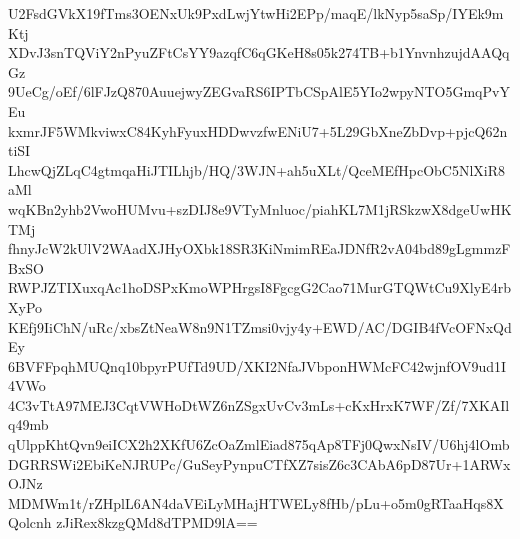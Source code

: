 U2FsdGVkX19fTms3OENxUk9PxdLwjYtwHi2EPp/maqE/lkNyp5saSp/IYEk9mKtj
XDvJ3snTQViY2nPyuZFtCsYY9azqfC6qGKeH8s05k274TB+b1YnvnhzujdAAQqGz
9UeCg/oEf/6lFJzQ870AuuejwyZEGvaRS6IPTbCSpAlE5YIo2wpyNTO5GmqPvYEu
kxmrJF5WMkviwxC84KyhFyuxHDDwvzfwENiU7+5L29GbXneZbDvp+pjcQ62ntiSI
LhcwQjZLqC4gtmqaHiJTILhjb/HQ/3WJN+ah5uXLt/QceMEfHpcObC5NlXiR8aMl
wqKBn2yhb2VwoHUMvu+szDIJ8e9VTyMnluoc/piahKL7M1jRSkzwX8dgeUwHKTMj
fhnyJcW2kUlV2WAadXJHyOXbk18SR3KiNmimREaJDNfR2vA04bd89gLgmmzFBxSO
RWPJZTIXuxqAc1hoDSPxKmoWPHrgsI8FgcgG2Cao71MurGTQWtCu9XlyE4rbXyPo
KEfj9IiChN/uRc/xbsZtNeaW8n9N1TZmsi0vjy4y+EWD/AC/DGIB4fVcOFNxQdEy
6BVFFpqhMUQnq10bpyrPUfTd9UD/XKI2NfaJVbponHWMcFC42wjnfOV9ud1I4VWo
4C3vTtA97MEJ3CqtVWHoDtWZ6nZSgxUvCv3mLs+cKxHrxK7WF/Zf/7XKAIlq49mb
qUlppKhtQvn9eiICX2h2XKfU6ZcOaZmlEiad875qAp8TFj0QwxNsIV/U6hj4lOmb
DGRRSWi2EbiKeNJRUPc/GuSeyPynpuCTfXZ7sisZ6c3CAbA6pD87Ur+1ARWxOJNz
MDMWm1t/rZHplL6AN4daVEiLyMHajHTWELy8fHb/pLu+o5m0gRTaaHqs8XQolcnh
zJiRex8kzgQMd8dTPMD9lA==
